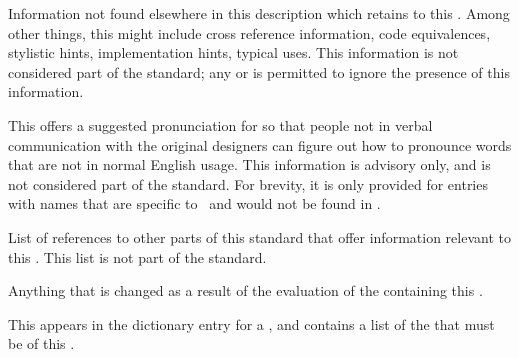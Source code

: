 \endsubsubsection%


Information not found elsewhere in this description
which retains to this .
Among other things, this might include 
 cross reference information,
 code equivalences, 
 stylistic hints,
 implementation hints,
 typical uses.
This information is not considered part of the standard;
any  or 
is permitted to ignore the presence of this information.

\endsubsubsection%


This offers a suggested pronunciation for  
so that people not in verbal communication with the original designers
can figure out how to pronounce words that are not in normal English usage.
This information is advisory only, and is not considered part of the standard.
For brevity, it is only provided for entries with names that are specific to
\clisp\ and would not be found in {\WebstersDictionary}.

\endsubsubsection%


List of references to other parts of this standard
that offer information relevant to this . 
This list is not part of the standard.
         
\endsubsubsection%


Anything that is changed as a result of the
evaluation of the  containing this .

\endsubsubsection%


This appears in the dictionary entry for a ,
and contains a list of the   
that must be  of this .

